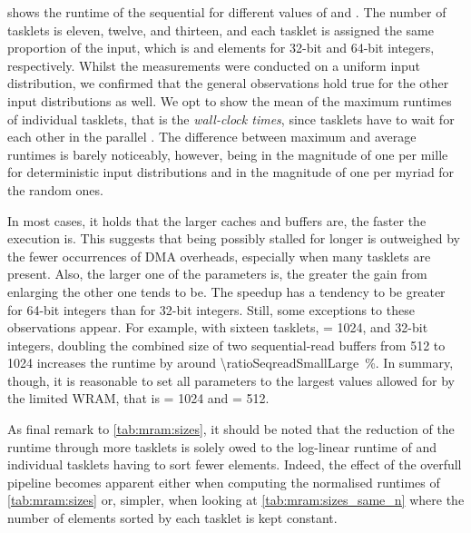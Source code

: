  shows the runtime of the sequential \MS{} for different values of \cachesize{} and \seqreadcachesize{}.
The number of tasklets is eleven, twelve, and thirteen, and each tasklet is assigned the same proportion of the input, which is  and  elements for 32-bit and 64-bit integers, respectively.
Whilst the measurements were conducted on a uniform input distribution, we confirmed that the general observations hold true for the other input distributions as well.
We opt to show the mean of the maximum runtimes of individual tasklets, that is the \emph{wall-clock times}, since tasklets have to wait for each other in the parallel \MS{}.
The difference between maximum and average runtimes is barely noticeably, however, being in the magnitude of one per mille for deterministic input distributions and in the magnitude of one per myriad for the random ones.

In most cases, it holds that the larger caches and buffers are, the faster the execution is.
This suggests that being possibly stalled for longer is outweighed by the fewer occurrences of \ac{DMA} overheads, especially when many tasklets are present.
Also, the larger one of the parameters is, the greater the gain from enlarging the other one tends to be.
The speedup has a tendency to be greater for 64-bit integers than for 32-bit integers.
Still, some exceptions to these observations appear.
For example, with sixteen tasklets, \cachesize{} = 1024, and 32-bit integers, doubling the combined size of two sequential-read buffers from \qty{512}{\byte} to \qty{1024}{\byte} increases the runtime by around \qty[round-mode=places, round-precision=0]{\ratioSeqreadSmallLarge}{\percent}.
In summary, though, it is reasonable to set all parameters to the largest values allowed for by the limited \ac{WRAM}, that is \cachesize{} = 1024 and \seqreadcachesize{} = 512.

As final remark to \cref{tab:mram:sizes}, it should be noted that the reduction of the runtime through more tasklets is solely owed to the log-linear runtime of \MS{} and individual tasklets having to sort fewer elements.
Indeed, the effect of the overfull pipeline becomes apparent either when computing the normalised runtimes of \cref{tab:mram:sizes} or, simpler, when looking at \cref{tab:mram:sizes_same_n} where the number of elements sorted by each tasklet is kept constant.

